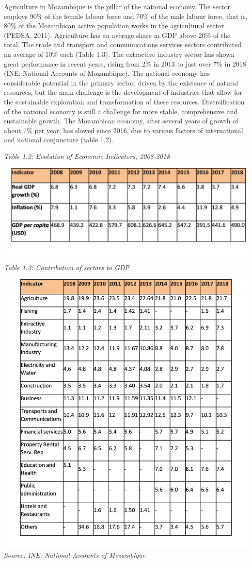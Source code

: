 \documentclass[
]{book}
\begin{document}
Agriculture in Mozambique is the pillar of the national economy. The sector employs 90\% of the female labour force and 70\% of the male labour force, that is, 80\% of the Mozambican active population works in the agricultural sector (PEDSA, 2011). Agriculture has an average share in GDP above 20\% of the total. The trade and transport and communications services sectors contributed an average of 10\% each (Table 1.3). The extractive industry sector has shown great performance in recent years, rising from 2\% in 2013 to just over 7\% in 2018 (INE: National Accounts of Mozambique). The national economy has considerable potential in the primary sector, driven by the existence of natural resources, but the main challenge is the development of industries that allow for the sustainable exploration and transformation of these resources. Diversification of the national economy is still a challenge for more stable, comprehensive and sustainable growth. The Mozambican economy, after several years of growth of about 7\% per year, has slowed since 2016, due to various factors of international and national conjuncture (table 1.2).

\emph{Table 1.2: Evolution of Economic Indicators, 2008-2018}

\includegraphics{Picture6.png}

\emph{Table 1.3: Contribution of sectors to GDP}

\includegraphics{Picture7.png}
\emph{Source: INE: National Accounts of Mozambique}
\end{document}
